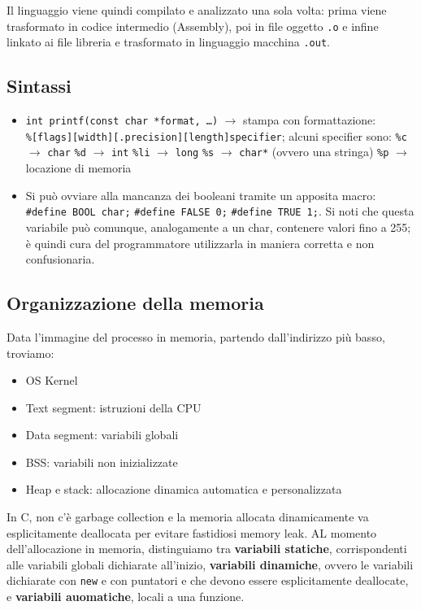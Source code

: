 \documentclass[11pt]{article}
\begin{document}
Il linguaggio viene quindi compilato e analizzato una sola volta: prima viene trasformato in codice intermedio (Assembly), poi in file oggetto \verb|.o| e infine linkato ai file libreria e trasformato in linguaggio macchina \verb|.out|.

\subsection{Sintassi}

\begin{itemize}
    \item\verb|int printf(const char *format, …)| $\rightarrow$ stampa con formattazione:\\ \verb|%[flags][width][.precision][length]specifier|; alcuni specifier sono:
          \subitem\verb|%c| $\rightarrow$ \verb|char|
          \subitem\verb|%d| $\rightarrow$ \verb|int|
          \subitem\verb|%li| $\rightarrow$ \verb|long|
          \subitem\verb|%s| $\rightarrow$ \verb|char*| (ovvero una stringa)
          \subitem\verb|%p| $\rightarrow$ locazione di memoria
    \item Si può ovviare alla mancanza dei booleani tramite un apposita macro: \verb|#define BOOL char;| \verb|#define FALSE 0;| \verb|#define TRUE 1;|. Si noti che questa variabile può comunque, analogamente a un char, contenere valori fino a 255; è quindi cura del programmatore utilizzarla in maniera corretta e non confusionaria.
\end{itemize}

\subsection{Organizzazione della memoria}

Data l'immagine del processo in memoria, partendo dall'indirizzo più basso, troviamo:
\begin{itemize}
    \item OS Kernel
    \item Text segment: istruzioni della CPU
    \item Data segment: variabili globali
    \item BSS: variabili non inizializzate
    \item Heap e stack: allocazione dinamica automatica e personalizzata
\end{itemize}

In C, non c'è garbage collection e la memoria allocata dinamicamente va esplicitamente deallocata per evitare fastidiosi memory leak. AL momento dell'allocazione in memoria, distinguiamo tra \textbf{variabili statiche}, corrispondenti alle variabili globali dichiarate all'inizio, \textbf{variabili dinamiche}, ovvero le variabili dichiarate con \verb|new| e con puntatori e che devono essere esplicitamente deallocate, e \textbf{variabili auomatiche}, locali a una funzione.
\end{document}
